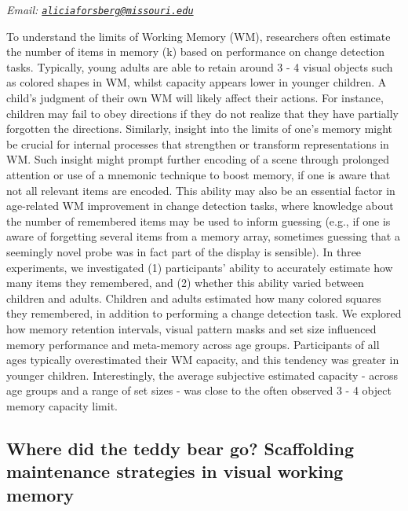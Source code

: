 \documentclass[
  12pt,
]{book}
\begin{document}
\emph{Email: \href{mailto:aliciaforsberg@missouri.edu}{\nolinkurl{aliciaforsberg@missouri.edu}}}

To understand the limits of Working Memory (WM), researchers often estimate the number of items in memory (k) based on performance on change detection tasks. Typically, young adults are able to retain around 3 - 4 visual objects such as colored shapes in WM, whilst capacity appears lower in younger children. A child's judgment of their own WM will likely affect their actions. For instance, children may fail to obey directions if they do not realize that they have partially forgotten the directions. Similarly, insight into the limits of one's memory might be crucial for internal processes that strengthen or transform representations in WM. Such insight might prompt further encoding of a scene through prolonged attention or use of a mnemonic technique to boost memory, if one is aware that not all relevant items are encoded. This ability may also be an essential factor in age-related WM improvement in change detection tasks, where knowledge about the number of remembered items may be used to inform guessing (e.g., if one is aware of forgetting several items from a memory array, sometimes guessing that a seemingly novel probe was in fact part of the display is sensible). In three experiments, we investigated (1) participants' ability to accurately estimate how many items they remembered, and (2) whether this ability varied between children and adults. Children and adults estimated how many colored squares they remembered, in addition to performing a change detection task. We explored how memory retention intervals, visual pattern masks and set size influenced memory performance and meta-memory across age groups. Participants of all ages typically overestimated their WM capacity, and this tendency was greater in younger children. Interestingly, the average subjective estimated capacity - across age groups and a range of set sizes - was close to the often observed 3 - 4 object memory capacity limit.

\hypertarget{where-did-the-teddy-bear-go-scaffolding-maintenance-strategies-in-visual-working-memory}{%
\subsection{Where did the teddy bear go? Scaffolding maintenance strategies in visual working memory}\label{where-did-the-teddy-bear-go-scaffolding-maintenance-strategies-in-visual-working-memory}}
\end{document}
